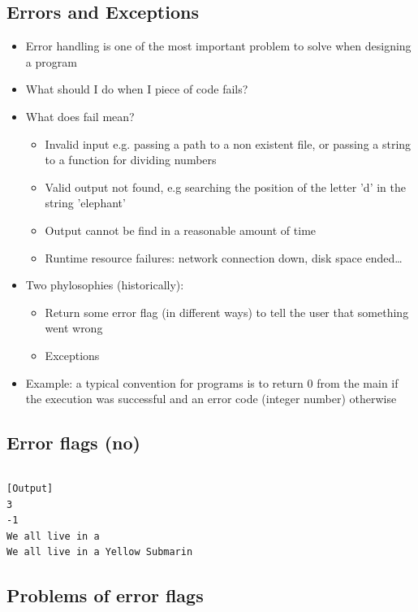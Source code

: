 \subsection{Errors and Exceptions}
  \begin{itemize}
    \item \alert{Error handling} is one of the most important problem to solve when designing a program
    \item What should I do when I piece of code fails?
    \item What does fail mean?
    \begin {itemize}
      \item Invalid input e.g. passing a path to a non existent file, or passing a string to a function for dividing numbers
      \item Valid output not found, e.g searching the position of the letter 'd' in the string 'elephant'
      \item Output cannot be find in a reasonable amount of time
      \item Runtime resource failures: network connection down, disk space ended\dots
    \end{itemize}
    \item Two phylosophies (historically):
    \begin{itemize}
      \item Return some \alert{error flag} (in different ways) to tell the user that something went wrong
      \item \alert{Exceptions}
    \end{itemize}
    \item Example: a typical convention for programs is to return 0 from the main if the execution was successful and an
          error code (integer number) otherwise
  \end{itemize}
  


\subsection{Error flags (no)}

\inputminted{python}{snippets/error_flags.py}
\begin{verbatim}
[Output]
3
-1
We all live in a
We all live in a Yellow Submarin
\end{verbatim}

\subsection{Problems of error flags}

